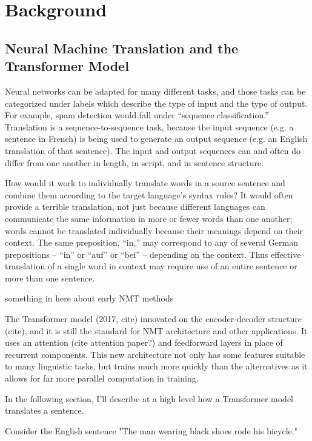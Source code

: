 \chapter{Background}
\label{chap:background}

\section{Neural Machine Translation and the Transformer Model}

Neural networks can be adapted for many different tasks, and those tasks can be categorized under 
labels which describe the type of input and the type of output. For example, spam detection would 
fall under “sequence classification.” Translation is a sequence-to-sequence task, because the input 
sequence (e.g. a sentence in French) is being used to generate an output sequence (e.g. an English 
translation of that sentence). The input and output sequences can and often do differ from one another 
in length, in script, and in sentence structure. 

How would it work to individually translate words in a source sentence and combine them according to 
the target language’s syntax rules? It would often provide a terrible translation, not just because 
different languages can communicate the same information in more or fewer words than one another; words 
cannot be translated individually because their meanings depend on their context. The same preposition, 
“in,” may correspond to any of several German prepositions – “in” or “auf” or “bei” – depending on the 
context. Thus effective translation of a single word in context may require use of an entire sentence or 
more than one sentence. 

something in here about early NMT methods

The Transformer model (2017, cite) innovated on the encoder-decoder structure (cite), and it is still the standard for NMT 
architecture and other applications. It uses an attention (cite attention paper?) and feedforward layers in place of recurrent components. 
This new architecture not only has some features suitable to many linguistic tasks, but trains much more quickly 
than the alternatives as it allows for far more parallel computation in training. 

In the following section, I'll describe at a high level how a Transformer model translates a sentence. 

Consider the English sentence "The man wearing black shoes rode his bicycle."

